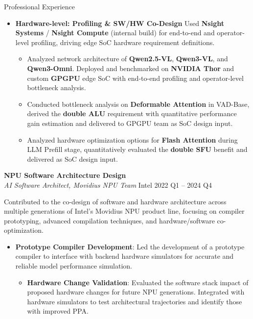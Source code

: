 \documentclass{resume} %
\begin{document}
\begin{rSection}{Professional Experience}
\begin{itemize}
\item \textbf{Hardware-level: Profiling \& SW/HW Co-Design}\newline
Used \textbf{Nsight Systems} / \textbf{Nsight Compute} (internal build) for end-to-end and operator-level profiling, driving edge SoC hardware requirement definitions.
\begin{itemize}
  \item Analyzed network architecture of \textbf{Qwen2.5-VL}, \textbf{Qwen3-VL}, and \textbf{Qwen3-Omni}. Deployed and benchmarked on \textbf{NVIDIA Thor} and custom \textbf{GPGPU} edge SoC with end-to-end profiling and operator-level bottleneck analysis.
  \item Conducted bottleneck analysis on \textbf{Deformable Attention} in VAD-Base, derived the \textbf{double ALU} requirement with quantitative performance gain estimation and delivered to GPGPU team as SoC design input.
  \item Analyzed hardware optimization options for \textbf{Flash Attention} during LLM Prefill stage, quantitatively evaluated the \textbf{double SFU} benefit and delivered as SoC design input.
\end{itemize}

\end{itemize}


\textbf{NPU Software Architecture Design} \\ %
\textit{AI Software Architect, Movidius NPU Team} \hfill Intel \hfill 2022 Q1 -- 2024 Q4

\vspace{4pt}

Contributed to the co-design of software and hardware architecture across multiple generations of Intel's Movidius NPU product line, focusing on compiler prototyping, advanced compilation techniques, and hardware/software co-optimization.

\begin{itemize}

\item \textbf{Prototype Compiler Development}:
Led the development of a prototype compiler to interface with backend hardware simulators for accurate and reliable model performance simulation.
\begin{itemize}
  \item \textbf{Hardware Change Validation}: 
  Evaluated the software stack impact of proposed hardware changes for future NPU generations. Integrated with hardware simulators to test architectural trajectories and identify those with improved PPA.
  

\end{itemize}
\end{itemize}
\end{rSection}
\end{document}
